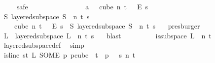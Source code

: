 \begin{isabellebody}
\ \ \ \ \isamarkupfalse%
{\isacharparenleft}{\kern0pt}safe{\isacharparenright}{\kern0pt}\isanewline
\ \ \ \ \ \ \isamarkupfalse%
\ {\isasymchi}\isanewline
\ \ \ \ \ \ \isamarkupfalse%
\ a{\isacharcolon}{\kern0pt}\ {\isachardoublequoteopen}{\isasymchi}\ {\isasymin}\ cube\ n\ {\isacharparenleft}{\kern0pt}t\ {\isacharplus}{\kern0pt}\ {}{\isacharparenright}{\kern0pt}\ {\isasymrightarrow}\isactrlsub E\ {\isacharbraceleft}{\kern0pt}{\isachardot}{\kern0pt}{\isachardot}{\kern0pt}{\isacharless}{\kern0pt}s{\isacharbraceright}{\kern0pt}{\isachardoublequoteclose}\isanewline
\ \ \ \ \ \ \isamarkupfalse%
\ \isamarkupfalse%
\ {\isachardoublequoteopen}{\isacharparenleft}{\kern0pt}{\isasymexists}S{\isachardot}{\kern0pt}\ layered{\isacharunderscore}{\kern0pt}subspace\ S\ {}\ n\ t\ s\ {\isasymchi}{\isacharparenright}{\kern0pt}{\isachardoublequoteclose}\ \isanewline
\ \ \ \ \ \ \ \ \isamarkupfalse%
\ {\isacartoucheopen}{\isasymforall}{\isasymchi}{\isachardot}{\kern0pt}\ {\isasymchi}\ {\isasymin}\ cube\ n\ {\isacharparenleft}{\kern0pt}t\ {\isacharplus}{\kern0pt}\ {}{\isacharparenright}{\kern0pt}\ {\isasymrightarrow}\isactrlsub E\ {\isacharbraceleft}{\kern0pt}{\isachardot}{\kern0pt}{\isachardot}{\kern0pt}{\isacharless}{\kern0pt}s{\isacharbraceright}{\kern0pt}\ {\isasymlongrightarrow}\ {\isacharparenleft}{\kern0pt}{\isasymexists}S{\isachardot}{\kern0pt}\ layered{\isacharunderscore}{\kern0pt}subspace\ S\ {}\ n\ t\ s\ {\isasymchi}{\isacharparenright}{\kern0pt}{\isacartoucheclose}\ \isamarkupfalse%
\ presburger\isanewline
\ \ \ \ \ \ \isamarkupfalse%
\ \isamarkupfalse%
\ L\ \ {\isachardoublequoteopen}layered{\isacharunderscore}{\kern0pt}subspace\ L\ {}\ n\ t\ s\ {\isasymchi}{\isachardoublequoteclose}\ \isamarkupfalse%
\ blast\isanewline
\ \ \ \ \ \ \isamarkupfalse%
\ \isamarkupfalse%
\ {\isachardoublequoteopen}is{\isacharunderscore}{\kern0pt}subspace\ L\ {}\ n\ {\isacharparenleft}{\kern0pt}t{\isacharplus}{\kern0pt}{}{\isacharparenright}{\kern0pt}{\isachardoublequoteclose}\ \isamarkupfalse%
\ layered{\isacharunderscore}{\kern0pt}subspace{\isacharunderscore}{\kern0pt}def\ \isamarkupfalse%
\ simp\isanewline
\ \ \ \ \ \ \isamarkupfalse%
\ \isamarkupfalse%
\ {\isachardoublequoteopen}is{\isacharunderscore}{\kern0pt}line\ {\isacharparenleft}{\kern0pt}{\isasymlambda}s{\isasymin}{\isacharbraceleft}{\kern0pt}{\isachardot}{\kern0pt}{\isachardot}{\kern0pt}{\isacharless}{\kern0pt}t{\isacharplus}{\kern0pt}{}{\isacharbraceright}{\kern0pt}{\isachardot}{\kern0pt}\ L\ {\isacharparenleft}{\kern0pt}SOME\ p{\isachardot}{\kern0pt}\ p{\isasymin}cube\ {}\ {\isacharparenleft}{\kern0pt}t{\isacharplus}{\kern0pt}{}{\isacharparenright}{\kern0pt}\ {\isasymand}\ p\ {}\ {\isacharequal}{\kern0pt}\ s{\isacharparenright}{\kern0pt}{\isacharparenright}{\kern0pt}\ n\ {\isacharparenleft}{\kern0pt}t\ {\isacharplus}{\kern0pt}\ {}{\isacharparenright}{\kern0pt}{\isachardoublequoteclose}\ \isamarkupfalse%

\end{isabellebody}

